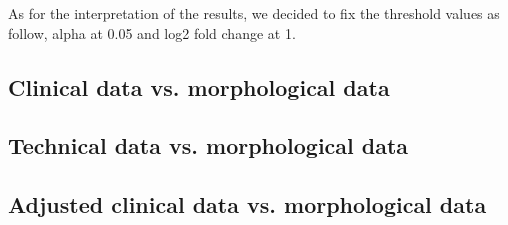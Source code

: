 \documentclass[a4paper, 11pt]{article}
\begin{document}
\begin{multicols}{2}
As for the interpretation of the results, we decided to fix the threshold values as follow, alpha at 0.05 and log2 fold change at 1.


\subsection{Clinical data vs. morphological data}
\subsection{Technical data vs. morphological data}
\subsection{Adjusted clinical data vs. morphological data}



\end{multicols}
\end{document}

